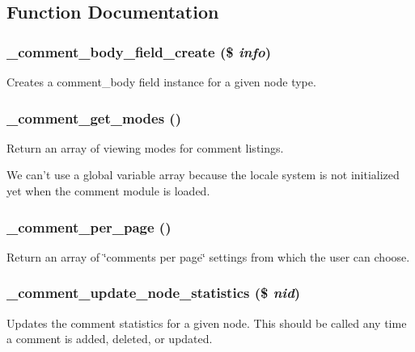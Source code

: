 \subsection{Function Documentation}
\hypertarget{comment_8module_a202aee66aac992dace1513fcf1432562}{
\subsubsection[{\_\-comment\_\-body\_\-field\_\-create}]{\setlength{\rightskip}{0pt plus 5cm}\_\-comment\_\-body\_\-field\_\-create (\$ {\em info})}}
\label{comment_8module_a202aee66aac992dace1513fcf1432562}
Creates a comment\_\-body field instance for a given node type. \hypertarget{comment_8module_a7a3a5128d41e8563f0649eae12b777c6}{
\subsubsection[{\_\-comment\_\-get\_\-modes}]{\setlength{\rightskip}{0pt plus 5cm}\_\-comment\_\-get\_\-modes ()}}
\label{comment_8module_a7a3a5128d41e8563f0649eae12b777c6}
Return an array of viewing modes for comment listings.

We can't use a global variable array because the locale system is not initialized yet when the comment module is loaded. \hypertarget{comment_8module_a1e6475bf270340be547ae0776f25aee8}{
\subsubsection[{\_\-comment\_\-per\_\-page}]{\setlength{\rightskip}{0pt plus 5cm}\_\-comment\_\-per\_\-page ()}}
\label{comment_8module_a1e6475bf270340be547ae0776f25aee8}
Return an array of \char`\"{}comments per page\char`\"{} settings from which the user can choose. \hypertarget{comment_8module_ac56251d7cb10cf61b8ee999bbbb50547}{
\subsubsection[{\_\-comment\_\-update\_\-node\_\-statistics}]{\setlength{\rightskip}{0pt plus 5cm}\_\-comment\_\-update\_\-node\_\-statistics (\$ {\em nid})}}
\label{comment_8module_ac56251d7cb10cf61b8ee999bbbb50547}
Updates the comment statistics for a given node. This should be called any time a comment is added, deleted, or updated.


